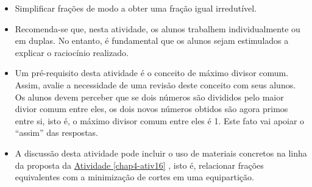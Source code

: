 \begin{multicols}{2}


\begin{objetivos}[label=chap4-ativ17]{}{}
\begin{itemize} %
    \item       Simplificar frações de modo a obter uma fração igual
irredutível.
\end{itemize} %

\end{objetivos}

\begin{orientacoes}{}{}

\begin{itemize} %
    \item       Recomenda-se que, nesta atividade, os alunos trabalhem
individualmente ou em duplas. No entanto, é fundamental que os alunos sejam
estimulados a explicar o raciocínio realizado.
    \item       Um pré-requisito desta atividade é o conceito de máximo divisor
comum. Assim, avalie a necessidade de uma revisão deste conceito com seus
alunos. Os alunos devem perceber que se dois números são divididos pelo maior
divior comum entre eles, os dois novos números obtidos são agora primos entre
si, isto é, o máximo divisor comum entre eles é 1. Este fato vai apoiar o
``assim''       das respostas.
    \item       A discussão desta atividade pode incluir o uso de materiais
concretos na linha da proposta da \hyperref[chap4-ativ16]{Atividade \ref{chap4-ativ16}}      , isto é, relacionar
frações equivalentes com a minimização de cortes em uma equipartição.
\end{itemize} %




\end{orientacoes}


\end{multicols}
